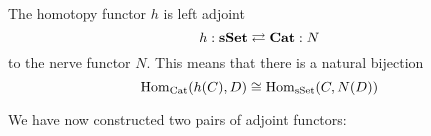 \documentclass[a4paper]{article}
\begin{document}
\begin{thm}{}{} The homotopy functor $h$ is left adjoint $$h:\bold{sSet}\rightleftarrows\bold{Cat}:N$$ to the nerve functor $N$. This means that there is a natural bijection $$\operatorname{Hom}_\text{Cat}(h(C),D)\cong\operatorname{Hom}_\text{sSet}(C,N(D))$$
\end{thm}

We have now constructed two pairs of adjoint functors: \\~\\
\\~\\
\end{document}
